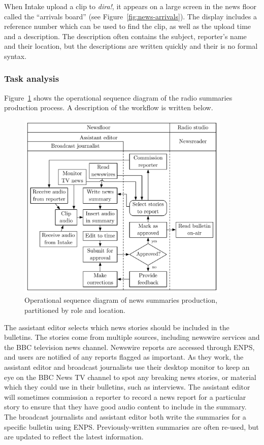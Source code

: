 When Intake upload a clip to \textit{dira!}, it appears on a large screen in the news floor called the ``arrivals
board'' (see Figure~\ref{fig:news-arrivals}). The display includes a reference number which can be used to find the
clip, as well as the upload time and a description. The description often contains the subject, reporter's name and
their location, but the descriptions are written quickly and their is no formal syntax.

\subsubsection{Task analysis}
Figure~\ref{fig:news-flowchart} shows the operational sequence diagram of the radio summaries production process. A
description of the workflow is written below.

\begin{figure}
	\centering
	\includegraphics[width=4in]{figs/news-workflow.pdf}
  \caption{Operational sequence diagram of news summaries production, partitioned by role and location.}
	\label{fig:news-flowchart}
\end{figure}

The assistant editor selects which news stories should be included in the bulletins. The stories come from multiple
sources, including newswire services and the BBC television news channel.
Newswire
reports are accessed through ENPS, and users are notified of any reports flagged as important.  As they work, the
assistant editor and broadcast journalists use their desktop monitor to keep an eye on the BBC News TV channel to spot
any breaking news stories, or material which they could use in their bulletins, such as interviews.  The assistant
editor will sometimes commission a reporter to record a news report for a particular story to ensure that they have
good audio content to include in the summary. The broadcast journalists and assistant editor both write the
summaries for a specific bulletin using ENPS. Previously-written summaries are often re-used, but are updated to
reflect the latest information.

